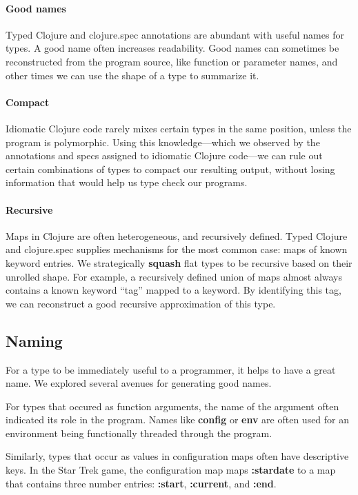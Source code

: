 \paragraph{Good names}
Typed Clojure and clojure.spec annotations are abundant
with useful names for types. A good name often increases
readability.
Good names can sometimes be reconstructed from the program source,
like function or parameter names, and other times 
we can use the shape of a type to summarize it.

\paragraph{Compact}
Idiomatic Clojure code rarely mixes certain types in the same position,
unless the program is polymorphic. Using this knowledge---which we observed
by the annotations and specs assigned to idiomatic Clojure 
code---we can rule out certain combinations of types to compact our
resulting output, without losing information that would help us
type check our programs.

\paragraph{Recursive}
Maps in Clojure are often heterogeneous, and recursively defined.
Typed Clojure and clojure.spec supplies mechanisms for the most
common case: maps of known keyword entries.
We strategically \textbf{squash} flat types to be recursive
based on their unrolled shape.
For example, a recursively defined union of maps almost always
contains a known keyword ``tag'' mapped to a keyword.
By identifying this tag, we can reconstruct a good recursive
approximation of this type.

\subsection{Naming}

For a type to be immediately useful to a programmer, it helps
to have a great name. We explored several avenues for
generating good names.

For types that occured as function arguments, the name of
the argument often indicated its role in the program.
Names like \textbf{config} or \textbf{env} are often used
for an environment being functionally threaded through
the program.

Similarly, types that occur as values in configuration
maps often have descriptive keys. In the Star Trek 
game, the configuration map maps \textbf{:stardate}
to a map that contains three number entries: 
\textbf{:start},
\textbf{:current}, and
\textbf{:end}.

